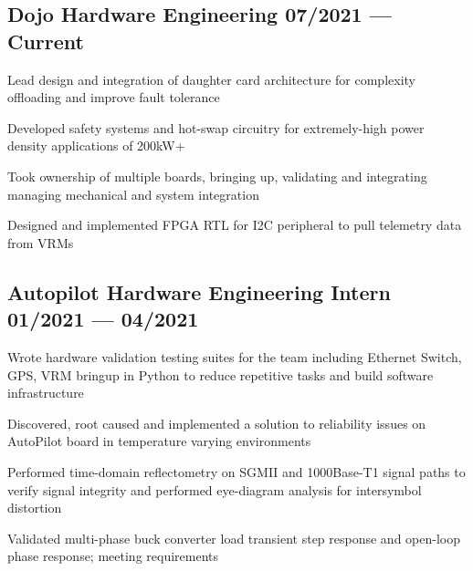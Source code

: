 \documentclass[letter,10pt]{article}
\begin{document}

\subsection{{Dojo Hardware Engineering \hfill 07/2021 --- Current}}
\begin{zitemize}
\item Lead design and integration of daughter card architecture for complexity offloading and improve fault tolerance
\item Developed safety systems and hot-swap circuitry for extremely-high power density applications of 200kW+
\item Took ownership of multiple boards, bringing up, validating and integrating managing mechanical and system integration
\item Designed and implemented FPGA RTL for I2C peripheral to pull telemetry data from VRMs
\end{zitemize}
{\color{sectiondivide} \vspace{-0.75em}\hrulefill}

\subsection{{Autopilot Hardware Engineering Intern \hfill 01/2021 --- 04/2021}}
\begin{zitemize}
\item Wrote hardware validation testing suites for the team including Ethernet Switch, GPS, VRM bringup in Python to reduce repetitive tasks and build software infrastructure
\item Discovered, root caused and implemented a solution to reliability issues on AutoPilot board in temperature varying environments
\item Performed time-domain reflectometry on SGMII and 1000Base-T1 signal paths to verify signal integrity and performed eye-diagram analysis for intersymbol distortion
\item Validated multi-phase buck converter load transient step response and open-loop phase response; meeting requirements
\end{zitemize}
{\color{sectiondivide} \vspace{-0.75em}\hrulefill}
\end{document}
